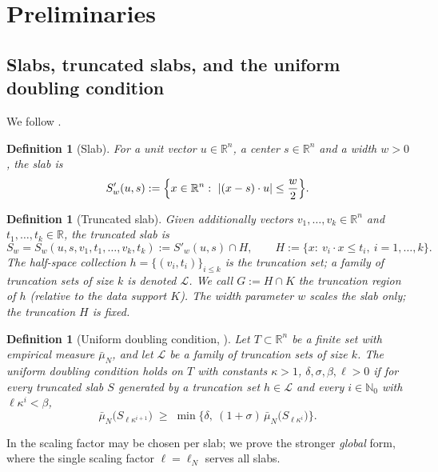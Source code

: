 \documentclass[11pt]{article}
\newtheorem{definition}[theorem]{Definition}
\newcommand{\R}{\mathbb{R}}
\newcommand{\emp}{\bar\mu_N}
\begin{document}
\section{Preliminaries}\label{sec:prelim}

\subsection{Slabs, truncated slabs, and the uniform doubling condition}

We follow \cite[Section 3]{ShmaloUDC}.

\begin{definition}[Slab]\label{def:slab}
For a unit vector $u\in\R^n$, a center $s\in\R^n$ and a width $w>0$, the slab is
\[
S'_w(u,s):=\Bigl\{x\in\R^n:\ |(x-s)\cdot u|\le\frac w2\Bigr\}.
\]
\end{definition}

\begin{definition}[Truncated slab]\label{def:tslab}
Given additionally vectors $v_1,\dots,v_k\in\R^n$ and $t_1,\dots,t_k\in\R$, the
truncated slab is
\[
S_w=S_w(u,s,v_1,t_1,\dots,v_k,t_k):=S'_w(u,s)\cap H,
\qquad
H:=\{x:\ v_i\cdot x\le t_i,\ i=1,\dots,k\}.
\]
The half-space collection $h=\{(v_i,t_i)\}_{i\le k}$ is the \emph{truncation set};
a family of truncation sets of size $k$ is denoted $\mathcal L$.  We call
$G:=H\cap K$ the \emph{truncation region} of $h$ (relative to the data support $K$).
The width parameter $w$ scales the slab only; the truncation $H$ is fixed.
\end{definition}

\begin{definition}[{Uniform doubling condition, \cite[Definition 3.3]{ShmaloUDC}}]\label{def:udc}
Let $T\subset\R^n$ be a finite set with empirical measure $\emp$, and let
$\mathcal L$ be a family of truncation sets of size $k$.  The \emph{uniform doubling
condition} holds on $T$ with constants $\kappa>1$, $\delta,\sigma,\beta,\ell>0$ if
for every truncated slab $S$ generated by a truncation set $h\in\mathcal L$ and every
$i\in\mathbb N_0$ with $\ell\kappa^i<\beta$,
\[
\emp\bigl(S_{\ell\kappa^{i+1}}\bigr)\;\ge\;
\min\bigl\{\delta,\ (1+\sigma)\,\emp\bigl(S_{\ell\kappa^{i}}\bigr)\bigr\}.
\]
\end{definition}

In \cite{ShmaloUDC} the scaling factor may be chosen per slab; we prove the stronger
\emph{global} form, where the single scaling factor $\ell=\ell_N$ serves all slabs.
\end{document}

